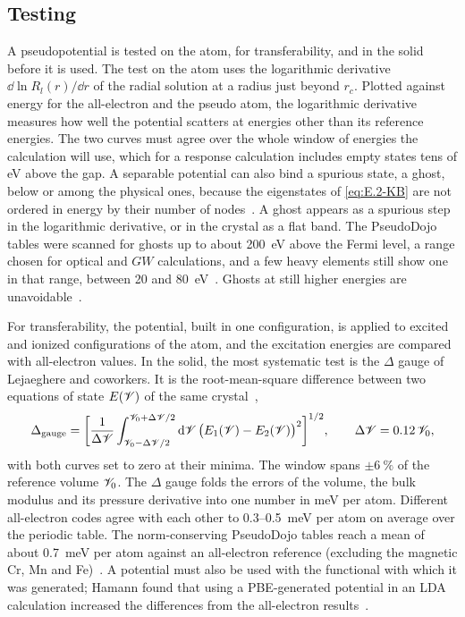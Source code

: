 \subsection{Testing}

A pseudopotential is tested on the atom, for transferability, and in the solid before it is used. The test on the atom uses the logarithmic derivative $\dd\ln R_l(r)/\dd r$ of the radial solution at a radius just beyond $r_c$. Plotted against energy for the all-electron and the pseudo atom, the logarithmic derivative measures how well the potential scatters at energies other than its reference energies. The two curves must agree over the whole window of energies the calculation will use, which for a response calculation includes empty states tens of eV above the gap. A separable potential can also bind a spurious state, a ghost, below or among the physical ones, because the eigenstates of \cref{eq:E.2-KB} are not ordered in energy by their number of nodes~\cite{hamann2013optimized}. A ghost appears as a spurious step in the logarithmic derivative, or in the crystal as a flat band. The PseudoDojo tables were scanned for ghosts up to about \SI{200}{eV} above the Fermi level, a range chosen for optical and $GW$ calculations, and a few heavy elements still show one in that range, between 20 and \SI{80}{eV}~\cite[Table~8]{vansetten2018pseudodojo}. Ghosts at still higher energies are unavoidable~\cite{vansetten2018pseudodojo}.

For transferability, the potential, built in one configuration, is applied to excited and ionized configurations of the atom, and the excitation energies are compared with all-electron values. In the solid, the most systematic test is the $\Delta$ gauge of Lejaeghere and coworkers. It is the root-mean-square difference between two equations of state $E(\mathscr{V})$ of the same crystal~\cite[Eq.~(15)]{lejaeghere2014error},
\begin{equation}
  \Delta_{\mathrm{gauge}} = \biggl[\frac{1}{\Delta \mathscr{V}}\int_{\mathscr{V}_0 - \Delta \mathscr{V}/2}^{\mathscr{V}_0 + \Delta \mathscr{V}/2}\mathrm{d} \mathscr{V}\,\bigl(E_1(\mathscr{V}) - E_2(\mathscr{V})\bigr)^2\biggr]^{1/2} , \qquad \Delta \mathscr{V} = 0.12\,\mathscr{V}_0 ,
  \label{eq:E.2-delta}
\end{equation}
with both curves set to zero at their minima. The window spans $\pm\SI{6}{\percent}$ of the reference volume $\mathscr{V}_0$. The $\Delta$ gauge folds the errors of the volume, the bulk modulus and its pressure derivative into one number in meV per atom. Different all-electron codes agree with each other to 0.3--\SI{0.5}{meV} per atom on average over the periodic table. The norm-conserving PseudoDojo tables reach a mean of about \SI{0.7}{meV} per atom against an all-electron reference (excluding the magnetic Cr, Mn and Fe)~\cite{vansetten2018pseudodojo}. A potential must also be used with the functional with which it was generated; Hamann found that using a PBE-generated potential in an LDA calculation increased the differences from the all-electron results~\cite{hamann2013optimized}.

